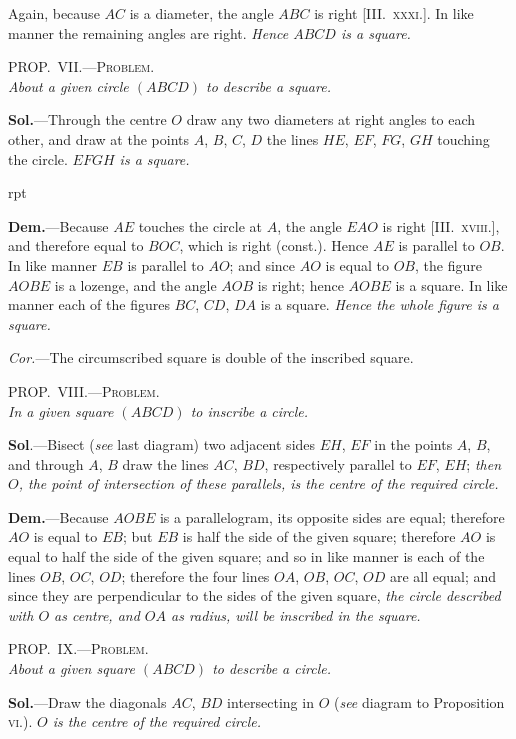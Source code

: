\documentclass[oneside]{book}
\newcommand\myprop[2]{
\bigskip\Needspace*{4\baselineskip}\begin{center}\textsc{#1}\\\medskip\emph{#2}\par\end{center}
}
\newcommand\imgflow[3]{
\setcounter{wrapwidth}{#1}
\begin{wrapfigure}[#2]{r}{\value{wrapwidth}pt}
\begin{center}
\vspace{-0.3in}
\end{center}
\end{wrapfigure}
}
\begin{document}
Again, because $AC$ is a diameter, the angle $ABC$
is right [\textsc{III\@.~xxxi.}]. In like manner the remaining
angles are right. \emph{Hence $ABCD$ is a square.}

\myprop{PROP\@.~VII\@.---Problem.}{About a given circle $(ABCD)$ to describe a square.}

\textbf{Sol.}---Through the centre $O$ draw any two diameters
at right angles to each other, and draw at the points
$A$, $B$, $C$, $D$ the lines $HE$, $EF$, $FG$, $GH$ touching the
circle. \emph{$EFGH$ is a square.}

\imgflow{120}{10}{f161}

\textbf{Dem.}---Because $AE$ touches the circle at $A$, the angle
$EAO$ is right [\textsc{III\@.~xviii.}], and
therefore equal to $BOC$, which
is right (const.). Hence $AE$ is
parallel to $OB$. In like manner
$EB$ is parallel to $AO$; and since
$AO$ is equal to $OB$, the figure
$AOBE$ is a lozenge, and the angle
$AOB$ is right; hence $AOBE$ is a
square. In like manner each of
the figures $BC$, $CD$, $DA$ is a
square. \emph{Hence the whole figure is a square.}

\emph{Cor.}---The circumscribed square is double of the inscribed
square.

\myprop{PROP\@.~VIII\@.---Problem.}{In a given square $(ABCD)$ to inscribe a circle.}

\textbf{Sol}.---Bisect (\emph{see} last diagram) two adjacent sides
$EH$, $EF$ in the points $A$, $B$, and through $A$, $B$ draw
the lines $AC$, $BD$, respectively parallel to $EF$, $EH$;
\emph{then $O$, the point of intersection of these parallels, is the
centre of the required circle.}

\textbf{Dem.}---Because $AOBE$ is a parallelogram, its opposite
sides are equal; therefore $AO$ is equal to $EB$; but
$EB$ is half the side of the given square; therefore $AO$
is equal to half the side of the given square; and so in
like manner is each of the lines $OB$, $OC$, $OD$; therefore
the four lines $OA$, $OB$, $OC$, $OD$ are all equal; and since
they are perpendicular to the sides of the given square,
\emph{the circle described with $O$ as centre, and $OA$ as radius,
will be inscribed in the square.}

\myprop{PROP\@.~IX\@.---Problem.}{About a given square\label{circlesquare} $(ABCD)$ to describe a circle.}

\textbf{Sol.}---Draw the diagonals $AC$, $BD$ intersecting in $O$
(\emph{see} diagram to Proposition \textsc{vi.}). \emph{$O$ is the centre of the
required circle.}
\end{document}
